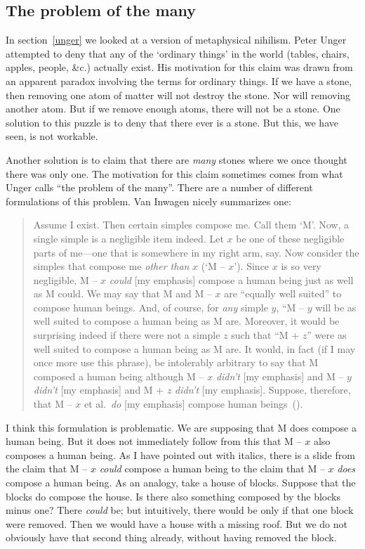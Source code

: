 \documentclass[11pt]{standalone} \newif\ifstandlone \standalonetrue
\newenvironment{squote}{%
	\begin{quote}\begin{singlespace}%
	}{%
	\end{singlespace}\end{quote}}
\begin{document}
\begin{spacing}{1.5}
\begin{enumerate}
\section{The problem of the many}
\label{many}
In section~\ref{unger} we looked at a version of metaphysical
nihilism.  Peter Unger attempted to deny that any of the `ordinary
things' in the world (tables, chairs, apples, people, \&c.) actually
exist.  His motivation for this claim was drawn from an apparent
paradox involving the terms for ordinary things.  If we have a stone,
then removing one atom of matter will not destroy the stone.  Nor will
removing another atom.  But if we remove enough atoms, there will not
be a stone.  One solution to this puzzle is to deny that there ever is
a stone.  But this, we have seen, is not workable.

Another solution is to claim that there are {\em many} stones where we
once thought there was only one.  The motivation for this claim
sometimes comes from what Unger calls ``the problem of the many''.
There are a number of different formulations of this problem.  Van
Inwagen nicely summarizes one:
\begin{squote}
Assume I exist.  Then certain simples compose me.  Call them `M'.
Now, a single simple is a negligible item indeed.  Let $x$ be one of
these negligible parts of me---one that is somewhere in my right arm,
say.  Now consider the simples that compose me {\em other than} $x$
(`M -- $x$').  Since $x$ is so very negligible, M -- $x$ {\em could}
[my emphasis] compose a human being just as well as M could.  We may
say that M and M -- $x$ are ``equally well suited'' to compose human
beings.  And, of course, for {\em any} simple $y$, ``M -- $y$ will be
as well suited to compose a human being as M are.  Moreover, it would
be surprising indeed if there were not a simple $z$ such that ``M +
$z$'' were as well suited to compose a human being as M are.  It
would, in fact (if I may once more use this phrase), be intolerably
arbitrary to say that M composed a human being although M -- $x$ {\em
  didn't} [my emphasis] and M -- $y$ {\em didn't} [my emphasis] and M
+ $z$ {\em didn't} [my emphasis].  Suppose, therefore, that M -- $x$
et al.\ {\em do} [my emphasis] compose human
beings~(\citeyear[215]{inwagen1995}).
\end{squote}

I think this formulation is problematic.  We are supposing that M does
compose a human being.  But it does not immediately follow from this
that M -- $x$ also composes a human being.  As I have pointed out with
italics, there is a slide from the claim that M -- $x$ {\em could}
compose a human being to the claim that M -- $x$ {\em does} compose a
human being.  As an analogy, take a house of blocks.  Suppose that the
blocks do compose the house.  Is there also something composed by the
blocks minus one? There {\em could} be; but intuitively, there would
be only if that one block were removed.  Then we would have a house
with a missing roof.  But we do not obviously have that second thing
already, without having removed the block.


\end{enumerate}
\end{spacing}
\end{document}
